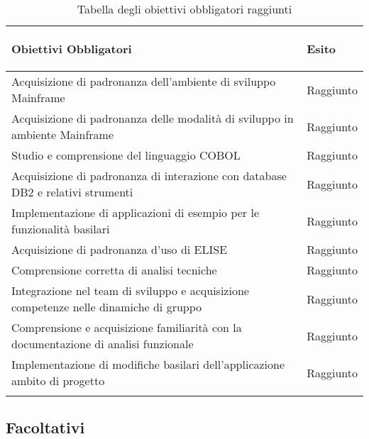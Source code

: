 		\begin{center}
		  \bgroup
		  \def\arraystretch{1.4}
		   \begin{longtable}{ | p{9cm} | p{2cm} | }  \hline
		   \label{TabellaObiettiviObbligatoriRaggiunti}
			 
			 \cellcolor[gray]{0.9} \textbf{Obiettivi Obbligatori} & \cellcolor[gray]{0.9} \textbf{Esito} \\ \hline
						 
			 Acquisizione di padronanza dell'ambiente di sviluppo Mainframe & Raggiunto \\ \hline
			 Acquisizione di padronanza delle modalità di sviluppo in ambiente Mainframe & Raggiunto \\ \hline
			 Studio e comprensione del linguaggio COBOL & Raggiunto \\ \hline
			 Acquisizione di padronanza di interazione con database DB2 e relativi strumenti & Raggiunto \\ \hline
			 Implementazione di applicazioni di esempio per le funzionalità basilari & Raggiunto \\ \hline
			 Acquisizione di padronanza d'uso di ELISE & Raggiunto \\ \hline
			 Comprensione corretta di analisi tecniche & Raggiunto \\ \hline
			 Integrazione nel team di sviluppo e acquisizione competenze nelle dinamiche di gruppo & Raggiunto \\ \hline
			 Comprensione e acquisizione familiarità con la documentazione di analisi funzionale & Raggiunto \\ \hline
			 Implementazione di modifiche basilari dell'applicazione ambito di progetto & Raggiunto \\ \hline
			
			\caption{Tabella degli obiettivi obbligatori raggiunti}
			
		    \end{longtable}
		  \egroup
		\end{center}

\subsection{Facoltativi}

